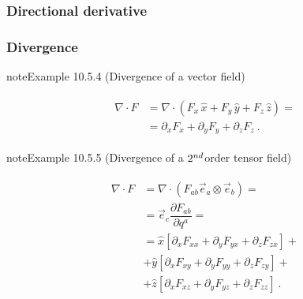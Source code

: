 \documentclass[letterpaper,10pt,english]{jupyterBook}
\begin{document}
\subsubsection{Directional derivative}
\label{\detokenize{ch/tensor-algebra-calculus/calculus-euclidean-cartesian:directional-derivative}}

\subsubsection{Divergence}
\label{\detokenize{ch/tensor-algebra-calculus/calculus-euclidean-cartesian:divergence}}\label{\detokenize{ch/tensor-algebra-calculus/calculus-euclidean-cartesian:tensor-calculus-cartesian-differential-operators-divergence}}\label{ch/tensor-algebra-calculus/calculus-euclidean-cartesian:cartesian:divergence:vector}
\begin{sphinxadmonition}{note}{Example 10.5.4 (Divergence of a vector field)}


\begin{equation*}
\begin{split}\begin{aligned}
 \nabla \cdot F 
  & = \nabla \cdot \left( F_x \, \hat{x} + F_y \, \hat{y} + F_z \, \hat{z} \right) = \\
  & = \partial_x F_x + \partial_y F_y + \partial_z F_z \ .
\end{aligned}\end{split}
\end{equation*}\end{sphinxadmonition}
\label{ch/tensor-algebra-calculus/calculus-euclidean-cartesian:example-4}
\begin{sphinxadmonition}{note}{Example 10.5.5 (Divergence of a \protect\(2^{nd}\protect\)\sphinxhyphen{}order tensor field)}


\begin{equation*}
\begin{split}\begin{aligned}
 \nabla \cdot F 
  & = \nabla \cdot \left( F_{ab} \vec{e}_a \otimes \vec{e}_b \right) = \\
  & = \vec{e}_c \dfrac{\partial F_{ab}}{\partial q^a} = \\
  & = \hat{x} \left[ \partial_x F_{xx} + \partial_y F_{yx} + \partial_z F_{zx} \right] + \\ 
  & + \hat{y} \left[ \partial_x F_{xy} + \partial_y F_{yy} + \partial_z F_{zy} \right] + \\ 
  & + \hat{z} \left[ \partial_x F_{xz} + \partial_y F_{yz} + \partial_z F_{zz} \right] \ .
\end{aligned}\end{split}
\end{equation*}\end{sphinxadmonition}
\end{document}
